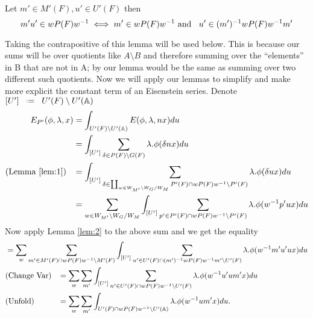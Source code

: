     \begin{Lemma}\label{lem:2}
        Let \(m'\in M'(F),  u'\in U'(F)\) then 
        \[m'u' \in wP(F)w^{-1} \iff m'\in wP(F)w^{-1} \text{ and  }\;\; u'\in (m')^{-1} wP(F)w^{-1} m'\]
    \end{Lemma}
    Taking the contrapositive of this lemma will be used below. This is because our sums will be over quotients like \(A\setminus B\) and therefore summing over the ``elements'' in B that are not in A; by our lemma would be the same as summing over two different such quotients.
Now we will apply our lemmas to simplify and make more explicit the constant term of an Eisenstein series. Denote \([U']\defeq U'(F)\setminus U'(\A)\)
    \begin{equation*}
        \begin{aligned}
            E_{P'}( \phi, \lambda, x) &= \int_{U'(F)\setminus U'(\A)} E( \phi, \lambda, nx) du\\
                                     &= \int_{[U']} \sum_{\delta\in P(F)\setminus G(F)} \lambda.\phi(\delta nx)  du\\
                                    (\text{Lemma }\ref{lem:1}) \;\;\; &= \int_{[U']} \sum_{\delta\in \coprod_{w\in W_{M'}\setminus W_G / W_{M}} P'(F)\cap wP(F)w\inv \setminus P'(F)} \lambda.\phi(\delta ux)  du\\
                                     &= \sum_{ w\in W_{M'}\setminus W_G / W_{M}}\int_{[U']} \sum_{p'\in P'(F)\cap wP(F)w\inv \setminus P'(F)} \lambda.\phi( w\inv p'ux)  du\\
        \end{aligned}
    \end{equation*}
    Now apply Lemma \ref{lem:2} to the above sum and we get the equality 
    \begin{align*}
    	&= \sum_{ w} \sum_{m'\in M'(F)\cap wP(F)w\inv\setminus M'(F)} \int_{[U']} \sum_{u'\in U'(F)\cap (m')\inv wP(F)w\inv m' \setminus U'(F)} \lambda.\phi( w\inv m'u'ux)  du\\
    	&(\text{Change Var}) \;\;\; = \sum_{ w} \sum_{m'} \int_{[U']} \sum_{n'\in U'(F)\cap wP(F)w\inv\setminus U'(F) } \lambda.\phi( w\inv u'um'x)  du\\
    	&(\text{Unfold}) \;\;\;\;\;\;\;\;\;\;\; = \sum_{ w} \sum_{m'} \int_{U'(F)\cap wP(F)w\inv \setminus U'(\A)} \lambda.\phi( w\inv um' x)  du.\\
    \end{align*}

